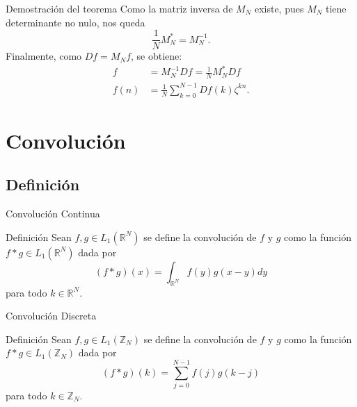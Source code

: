 \documentclass[11pt,compress]{beamer}
\newcommand\C{\mathbb{C}}
\newcommand\R{\mathbb{R}}
\newcommand\Z{\mathbb{Z}}
\begin{document}
\begin{frame}
\begin{block}{Demostración del teorema}
Como la matriz inversa de $M_N$ existe, pues $M_N$ tiene determinante no nulo, nos queda
\[
    \frac{1}{N}M_N^{\ast} = M_N^{-1}.
\]
Finalmente, como $Df = M_N f$, se obtiene:
\begin{align*}
	f &= M_N^{-1}Df = \frac{1}{N}M_N^{\ast}Df \\
	f(n) &= \frac{1}{N} \sum_{k=0}^{N-1} Df(k) \zeta ^{kn}. 
\end{align*}
\end{block}
\end{frame}



\section{Convolución}
\subsection{Definición}
\begin{frame}{Convolución Continua}
\begin{block}{Definición}
Sean $f,g \in L_1(\R^N)$ se define la convolución de $f$ y $g$ como la función $f \ast g \in L_1(\R^N)$ dada por
\[
(f\ast g)(x)=\int_{\R^N}f(y)g(x-y)dy
\]
para todo $k \in \R^N$.
\end{block}

\end{frame}

\begin{frame}{Convolución Discreta}
\begin{block}{Definición}
Sean $f,g \in L_1(\Z_N)$ se define la convolución de $f$ y $g$ como la función $f \ast g \in L_1(\Z_N)$ dada por
\[
(f\ast g)(k)=\sum_{j=0}^{N-1}f(j)g(k-j)
\]
para todo $k \in \Z_N$.
\end{block}

\end{frame}
\end{document}

